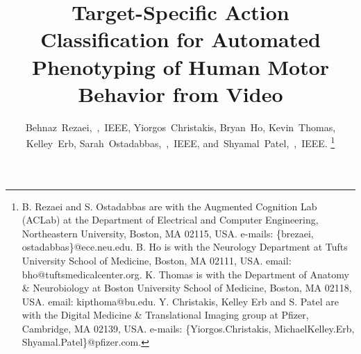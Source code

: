 \documentclass[sensors,article,submit,moreauthors,pdftex]{Definitions/mdpi}
\begin{document}
%
\title{Target-Specific Action Classification for Automated Phenotyping of Human Motor Behavior from Video} %
%
%
%

\author{Behnaz~Rezaei,~,~IEEE,
        Yiorgos~Christakis,
        Bryan~Ho,
        Kevin~Thomas,
        Kelley~Erb,
        Sarah~Ostadabbas,~,~IEEE,
        and~Shyamal~Patel,~,~IEEE.%
\thanks{B. Rezaei and S. Ostadabbas are with the Augmented Cognition Lab (ACLab) at the Department
of Electrical and Computer Engineering, Northeastern University, Boston,
MA 02115, USA. e-mails: \{brezaei, ostadabbas\}@ece.neu.edu.
B. Ho is with the Neurology Department at Tufts University School of Medicine, Boston, MA 02111, USA. email: bho@tuftsmedicalcenter.org.
K. Thomas is with the Department of Anatomy & Neurobiology at Boston University School of Medicine, Boston, MA 02118, USA. email: kipthoma@bu.edu.
Y. Christakis, Kelley Erb and S. Patel are with the Digital Medicine \& Translational Imaging group at Pfizer, Cambridge, MA 02139, USA. e-mails: \{Yiorgos.Christakis, MichaelKelley.Erb, Shyamal.Patel\}@pfizer.com.
}
}%

% 
%
\end{document}
